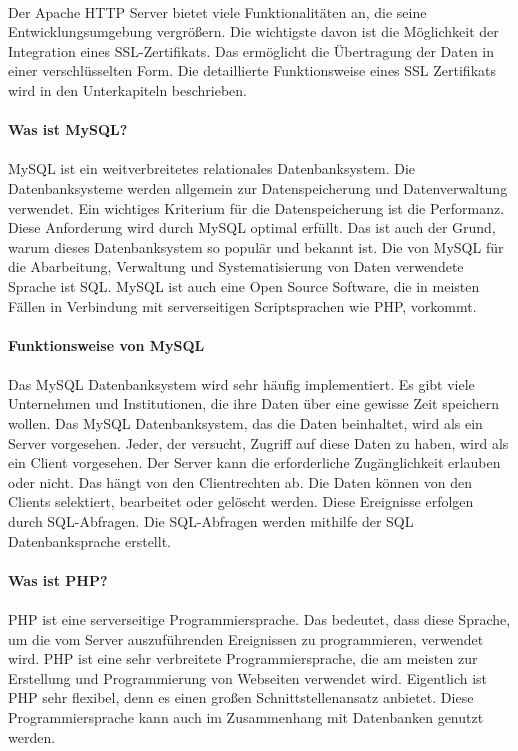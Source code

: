 \\
Der Apache HTTP Server bietet viele Funktionalitäten an, die seine Entwicklungsumgebung vergrößern. Die wichtigste davon ist die Möglichkeit der Integration eines SSL-Zertifikats. Das ermöglicht die Übertragung der Daten in einer verschlüsselten Form. Die detaillierte Funktionsweise eines SSL Zertifikats wird in den Unterkapiteln beschrieben. 
\\ 
\\
\textbf{Was ist MySQL?} \\
\\
MySQL ist ein weitverbreitetes relationales Datenbanksystem. Die Datenbanksysteme werden allgemein zur Datenspeicherung und Datenverwaltung verwendet. Ein wichtiges Kriterium für die Datenspeicherung ist die Performanz. Diese Anforderung wird durch MySQL optimal erfüllt. Das ist auch der Grund, warum dieses Datenbanksystem so populär und bekannt ist. Die von MySQL für die Abarbeitung, Verwaltung und Systematisierung von Daten verwendete Sprache ist SQL. MySQL ist auch eine Open Source Software,
die in meisten Fällen in Verbindung mit serverseitigen Scriptsprachen wie PHP, vorkommt.
\\
\\
\textbf{Funktionsweise von MySQL} \\
\\
Das MySQL Datenbanksystem wird sehr häufig implementiert. Es gibt viele Unternehmen und Institutionen, die ihre Daten über eine gewisse Zeit speichern wollen. Das MySQL Datenbanksystem, das die Daten beinhaltet, wird als ein Server vorgesehen. Jeder, der versucht, Zugriff auf diese Daten zu haben, wird als ein Client vorgesehen. Der Server kann die erforderliche Zugänglichkeit erlauben oder nicht. Das hängt von den Clientrechten ab. Die Daten können von den Clients selektiert, bearbeitet oder gelöscht werden. Diese Ereignisse erfolgen durch SQL-Abfragen. Die SQL-Abfragen werden mithilfe der SQL Datenbanksprache erstellt. 
\\
\\ 
\textbf{Was ist PHP?} \\
\\
PHP ist eine serverseitige Programmiersprache. Das bedeutet, dass diese Sprache, um 
die vom Server auszuführenden Ereignissen zu programmieren, verwendet wird. 
PHP ist eine sehr verbreitete Programmiersprache, die am meisten zur Erstellung und Programmierung von Webseiten verwendet wird. Eigentlich ist PHP sehr flexibel, denn es einen großen Schnittstellenansatz anbietet.  Diese Programmiersprache kann auch im Zusammenhang mit Datenbanken genutzt werden. 
